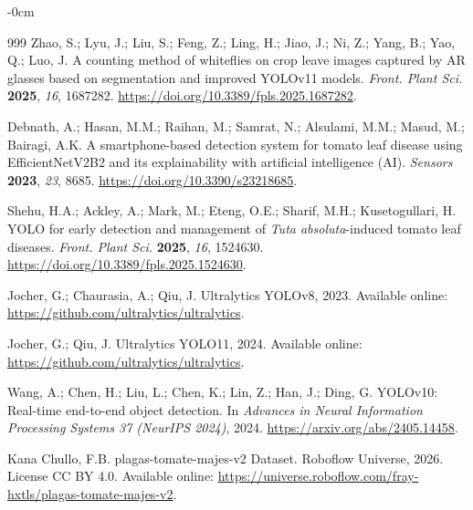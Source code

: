 \documentclass[sensors,article,submit,pdftex,moreauthors]{Definitions/mdpi}
\begin{document}
\begin{adjustwidth}{-\extralength}{0cm}
\begin{thebibliography}{999}
Zhao, S.; Lyu, J.; Liu, S.; Feng, Z.; Ling, H.; Jiao, J.; Ni, Z.; Yang, B.; Yao, Q.; Luo, J. A counting method of whiteflies on crop leave images captured by AR glasses based on segmentation and improved YOLOv11 models. {\em Front. Plant Sci.} {\bf 2025}, {\em 16}, 1687282. \url{https://doi.org/10.3389/fpls.2025.1687282}.

Debnath, A.; Hasan, M.M.; Raihan, M.; Samrat, N.; Alsulami, M.M.; Masud, M.; Bairagi, A.K. A smartphone-based detection system for tomato leaf disease using EfficientNetV2B2 and its explainability with artificial intelligence (AI). {\em Sensors} {\bf 2023}, {\em 23}, 8685. \url{https://doi.org/10.3390/s23218685}.

Shehu, H.A.; Ackley, A.; Mark, M.; Eteng, O.E.; Sharif, M.H.; Kusetogullari, H. YOLO for early detection and management of \emph{Tuta absoluta}-induced tomato leaf diseases. {\em Front. Plant Sci.} {\bf 2025}, {\em 16}, 1524630. \url{https://doi.org/10.3389/fpls.2025.1524630}.

Jocher, G.; Chaurasia, A.; Qiu, J. Ultralytics YOLOv8, 2023. Available online: \url{https://github.com/ultralytics/ultralytics}.

Jocher, G.; Qiu, J. Ultralytics YOLO11, 2024. Available online: \url{https://github.com/ultralytics/ultralytics}.

Wang, A.; Chen, H.; Liu, L.; Chen, K.; Lin, Z.; Han, J.; Ding, G. YOLOv10: Real-time end-to-end object detection. In {\em Advances in Neural Information Processing Systems 37 (NeurIPS 2024)}, 2024. \url{https://arxiv.org/abs/2405.14458}.

Kana Chullo, F.B. plagas-tomate-majes-v2 Dataset. Roboflow Universe, 2026. License CC BY 4.0. Available online: \url{https://universe.roboflow.com/fray-hxtls/plagas-tomate-majes-v2}.

\end{thebibliography}
\end{adjustwidth}
\end{document}
